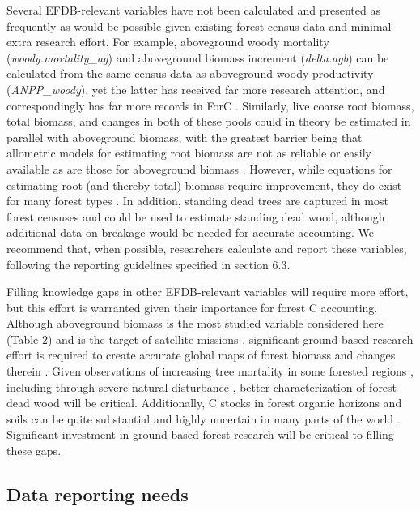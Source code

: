 \documentclass[, manuscript]{copernicus}
\begin{document}
Several EFDB-relevant variables have not been calculated and presented
as frequently as would be possible given existing forest census data and
minimal extra research effort. For example, aboveground woody mortality
(\emph{woody.mortality\_ag}) and aboveground biomass increment
(\emph{delta.agb}) can be calculated from the same census data as
aboveground woody productivity (\emph{ANPP\_woody}), yet the latter has
received far more research attention, and correspondingly has far more
records in ForC \citetext{\citealp[Table
2,][]{anderson-teixeira_carbon_2021}; \citealp[but
see][]{piponiot_distribution_2022}}. Similarly, live coarse root
biomass, total biomass, and changes in both of these pools could in
theory be estimated in parallel with aboveground biomass, with the
greatest barrier being that allometric models for estimating root
biomass are not as reliable or easily available as are those for
aboveground biomass
\citep{chave_improved_2014, rejou-mechain_biomass_2017, gonzalez-akre_allodb_2022}.
However, while equations for estimating root (and thereby total) biomass
require improvement, they do exist for many forest types
\citep[e.g.,][]{brassard_coarse_2011, chojnacky_updated_2014, waring_overlooking_2017}.
In addition, standing dead trees are captured in most forest censuses
and could be used to estimate standing dead wood, although additional
data on breakage would be needed for accurate accounting. We recommend
that, when possible, researchers calculate and report these variables,
following the reporting guidelines specified in section 6.3.

Filling knowledge gaps in other EFDB-relevant variables will require
more effort, but this effort is warranted given their importance for
forest C accounting. Although aboveground biomass is the most studied
variable considered here (Table 2) and is the target of satellite
missions \citep{refs}, significant ground-based research effort is
required to create accurate global maps of forest biomass and changes
therein \citep{refs}. Given observations of increasing tree mortality in
some forested regions \citep{refs}, including through severe natural
disturbance \citep{refs}, better characterization of forest dead wood
will be critical. Additionally, C stocks in forest organic horizons and
soils can be quite substantial and highly uncertain in many parts of the
world \citep{refs}. Significant investment in ground-based forest
research will be critical to filling these gaps.

\subsection{Data reporting needs}
\end{document}
